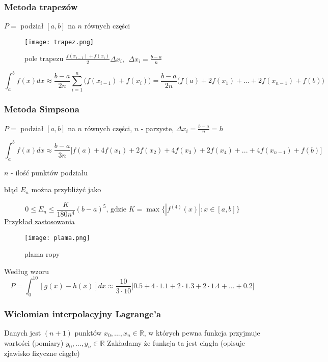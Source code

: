 \documentclass{article}
\theoremstyle{definition}
\theoremstyle{definition}
\theoremstyle{definition}
\begin{document}
\subsubsection{Metoda trapezów}

$P=$ podział $[a,b]$ na $n$ równych części

\begin{figure}[h]
\centering
\texttt{[image: trapez.png]}

pole trapezu $ \frac{f(x_{i-1}) + f(x_i)}{2} \Delta x_i ,
\ \ \Delta x_i=\frac{b-a}{n}$
\end{figure}

$$ 
\int_a^b f(x) dx \approx \frac{b-a}{2n} \sum_{i=1}^n \big(f(x_{i-1})+f(x_i)\big) = 
\frac{b-a}{2n} \big(f(a) +2f(x_1) + ... + 2f(x_{n-1}) + f(b) \big)
$$

\subsubsection{Metoda Simpsona}

$P=$ podział $[a,b]$ na $n$ równych części, $n$ - parzyste,
$\Delta x_i=\frac{b-a}{n} = h$

$$
\int_a^b f(x) dx \approx
\frac{b-a}{3n}
\bigg[
f(a) +4f(x_1) + 2f(x_2) + 4f(x_3) + 2f(x_4) +...+
4f(x_{n-1}) + f(b)
\bigg]
$$

$n$ - ilość punktów podziału

błąd $E_n$ można przybliżyć jako

$$
0 \leq E_n \leq \frac{K}{180n^4}(b-a)^5
\text{, gdzie }
K = \max\{|f^{(4)}(x)|: x \in [a,b]\}
$$
\newpage
\underline{Przykład zastosowania}

\begin{figure}[h!]
\centering
\texttt{[image: plama.png]}

plama ropy
\end{figure}

Według wzoru
$$
P = \int_0^{10} [g(x)-h(x)] dx \approx
\frac{10}{3\cdot10} \bigg[0.5 + 4\cdot1.1 + 2\cdot1.3 + 2\cdot1.4 + ... + 0.2 \bigg]
$$

\subsubsection{Wielomian interpolacyjny Lagrange'a}

Danych jest $(n+1)$ punktów $x_0,...,x_n \in \mathbb{R}$, w których pewna 
funkcja przyjmuje wartości (pomiary) $y_0,...,y_n \in \mathbb{R}$
Zakładamy że funkcja ta jest ciągła (opisuje zjawisko fizyczne ciągłe)
\end{document}
